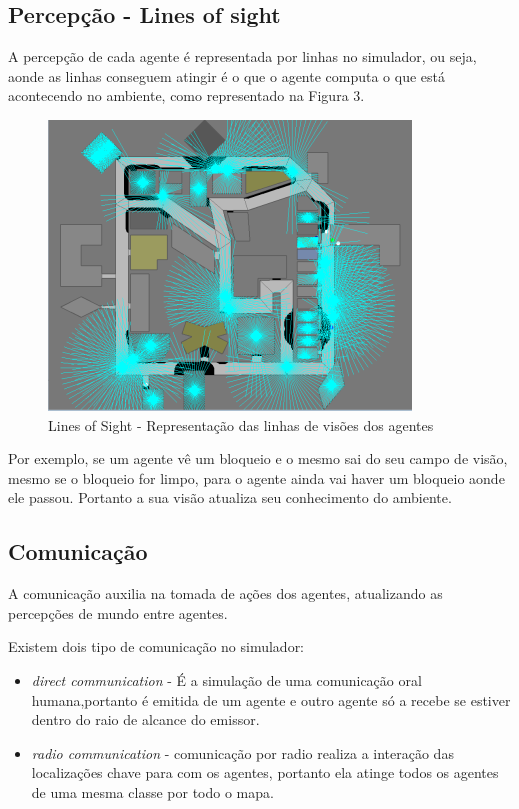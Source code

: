 \documentclass[conference]{IEEEtran}
\begin{document}
\subsection{Percepção - Lines of sight}
A percepção de cada agente é representada por linhas no simulador, ou seja, aonde as linhas conseguem atingir é o que o agente computa o que está acontecendo no ambiente, como representado na Figura 3.
\begin{figure}[htbp]
\centerline{\includegraphics[scale=0.5]{fig2.png}}
\caption{Lines of Sight - Representação das linhas de visões dos agentes \cite{b1}}
\label{fig}
\end{figure}
Por exemplo, se um agente vê um bloqueio e o mesmo sai do seu campo de visão, mesmo se o bloqueio for limpo, para o agente ainda vai haver um bloqueio aonde ele passou. Portanto a sua visão atualiza seu conhecimento do ambiente.

\subsection{Comunicação}
A comunicação auxilia na tomada de ações dos agentes, atualizando as percepções de mundo entre agentes.

Existem dois tipo de comunicação no simulador:
\begin{itemize}
\item \textit {direct communication} - É a simulação de uma comunicação oral humana,portanto é emitida de um agente e outro agente só a recebe se estiver dentro do raio de alcance do emissor.
\item \textit {radio communication} - comunicação por radio realiza a interação das localizações chave para com os agentes, portanto ela atinge todos os agentes de uma mesma classe por todo o mapa.
\end{itemize}
\end{document}
